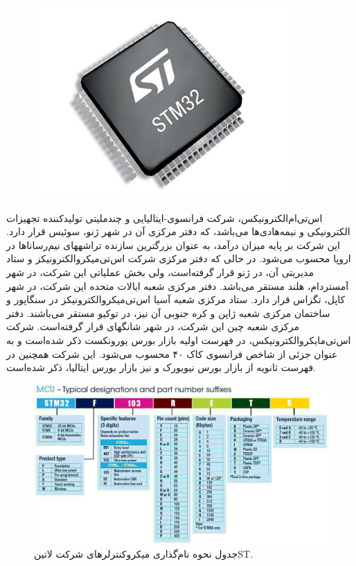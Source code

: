\begin{figure}[!h]
	\centering
	\includegraphics[width=0.7\linewidth]{Assets/stm.png}
\end{figure}
اس‌تی‌ام‌الکترونیکس، شرکت فرانسوی-ایتالیایی و چندملیتی تولیدکننده تجهیزات الکترونیکی و نیمه‌هادی‌ها می‌باشد، که دفتر مرکزی آن در شهر ژنو، سوئیس قرار دارد. این شرکت بر پایه میزان درآمد، به عنوان بزرگترین سازنده تراشههای نیم‌رساناها در اروپا محسوب می‌شود. در حالی که دفتر مرکزی شرکت اس‌تی‌میکروالکترونیکز و ستاد مدیریتی آن، در ژنو قرار گرفته‌است، ولی بخش عملیاتی این شرکت، در شهر آمستردام، هلند مستقر می‌باشد. دفتر مرکزی شعبه ایالات متحده این شرکت، در شهر کاپل، تگزاس قرار دارد. ستاد مرکزی شعبه آسیا اس‌تی‌میکروالکترونیکز در سنگاپور و ساختمان مرکزی شعبه ژاپن و کره جنوبی آن نیز، در توکیو مستقر می‌باشند. دفتر مرکزی شعبه چین این شرکت، در شهر شانگهای قرار گرفته‌است. شرکت اس‌تی‌مایکروالکترونیکس، در فهرست اولیه بازار بورس یورونکست ذکر شده‌است و به عنوان جزئی از شاخص فرانسوی کاک ۴۰ محسوب می‌شود. این شرکت همچنین در فهرست ثانویه از بازار بورس نیویورک و نیز بازار بورس ایتالیا، ذکر شده‌است.

\begin{figure}[!h]
	\centering
	\includegraphics[width=\linewidth]{Assets/stmnaming.png}
	\caption{جدول نحوه نام‌گذاری میکروکنترلرهای شرکت ‌لاتین{ST}.}
	\label{fig:stmnaming}
\end{figure}

